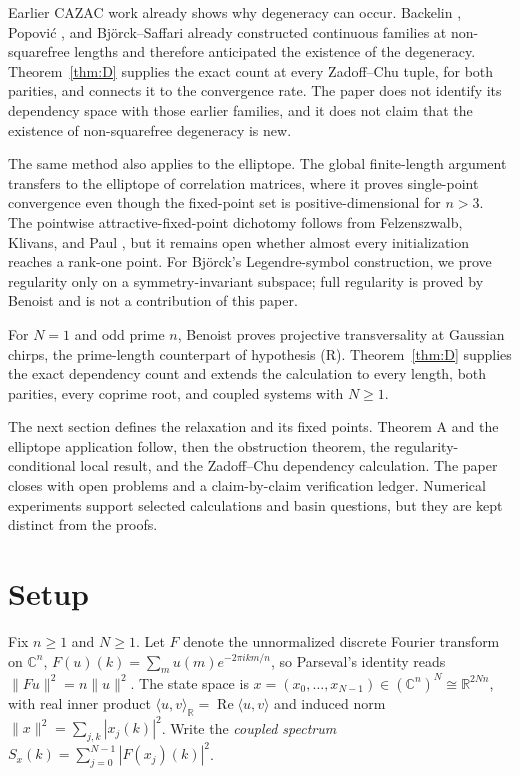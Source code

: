 \documentclass[11pt]{article}
\theoremstyle{plain}
\theoremstyle{definition}
\theoremstyle{remark}
\newcommand{\R}{\mathbb R}
\newcommand{\C}{\mathbb C}
\newcommand{\re}{\operatorname{Re}}
\begin{document}
Earlier CAZAC work already shows why degeneracy can occur.  Backelin
\cite{Backelin89}, Popovi\'c \cite{Popovic92}, and Bj\"orck--Saffari
\cite{BjorckSaffari95} already constructed continuous families at
non-squarefree lengths and therefore anticipated the existence of the
degeneracy.  Theorem~\ref{thm:D} supplies the exact count at every
Zadoff--Chu tuple, for both parities, and connects it to the convergence
rate.  The paper does not identify its dependency space with those earlier
families, and it does not claim that the existence of non-squarefree
degeneracy is new.

The same method also applies to the elliptope.  The global
finite-length argument transfers to the elliptope of correlation matrices,
where it proves single-point convergence even though the fixed-point set is
positive-dimensional for $n>3$.  The pointwise attractive-fixed-point
dichotomy follows from Felzenszwalb, Klivans, and Paul \cite{FKP21}, but it
remains open whether almost every initialization reaches a rank-one point.
For Bj\"orck's Legendre-symbol construction, we prove regularity only
on a symmetry-invariant subspace; full regularity is proved by Benoist
\cite{Benoist24} and is not a contribution of this paper.

For $N=1$ and odd prime $n$, Benoist \cite[Prop.~A.2]{Benoist24} proves
projective transversality at Gaussian chirps, the prime-length counterpart
of hypothesis (R).  Theorem~\ref{thm:D} supplies the exact dependency count
and extends the calculation to every length, both parities, every coprime
root, and coupled systems with $N\ge1$.

The next section defines the relaxation and its fixed points.  Theorem A and
the elliptope application follow, then the obstruction theorem, the
regularity-conditional local result, and the Zadoff--Chu dependency
calculation.  The paper closes with open problems and a claim-by-claim
verification ledger.  Numerical experiments support selected calculations
and basin questions, but they are kept distinct from the proofs.

\section{Setup}\label{sec:setup}

Fix $n\ge1$ and $N\ge1$. Let $F$ denote the unnormalized discrete Fourier
transform on $\C^n$, $F(u)(k)=\sum_m u(m)e^{-2\pi ikm/n}$, so Parseval's
identity reads $\|Fu\|^2=n\|u\|^2$. The state space is
$x=(x_0,\dots,x_{N-1})\in(\C^n)^N\cong\R^{2Nn}$, with real inner product
$\langle u,v\rangle_\R=\re\langle u,v\rangle$ and induced norm
$\|x\|^2=\sum_{j,k}|x_j(k)|^2$. Write the \emph{coupled spectrum}
$S_x(k)=\sum_{j=0}^{N-1}|F(x_j)(k)|^2$.
\end{document}
